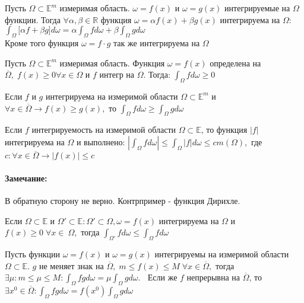 \begin{theorem}
	Пусть $\Omega\subset \mathbb{E}^m$ измеримая область. $\omega=f(x)$  и $\omega=g(x)$ интегрируемые на $\Omega$ функции. Тогда $\forall \alpha, \beta\in\mathbb{R} $ функция $\omega= \alpha f(x) + \beta g(x) $ интегрируема на $\Omega$: \\
	$\int_\Omega \big[\alpha f + \beta g \big]d\omega = \alpha \int_\Omega fd\omega + \beta \int_\Omega gd\omega$  \\
	Кроме того функция $\omega=f\cdot g $ так же интегрируема на $\Omega$ 
\end{theorem}

\begin{theorem}
	Пусть $\Omega\subset \mathbb{E}^m$ измеримая область. Функция $\omega=f(x)$ определена на $\overline{\Omega}, \; f(x)\geq 0 \forall x\in \Omega$ и $f$ интегр на $\Omega$. Тогда: $\int_\Omega fd\omega\geq 0  $
\end{theorem}

\begin{theorem}
	Если $f$ и $g$ интегрируема на измеримой области $\Omega \subset \mathbb{E}^m $ и $\forall x\in \overline{\Omega} \rightarrow f(x) \geq g(x), $ то $ \int_\Omega fd\omega\geq \int_\Omega gd\omega$ 
\end{theorem}

\begin{theorem}
	Если $f$  интегрируемость на измеримой области $\Omega \subset \mathbb{E} $, то функция $|f|$ интегрируема на $\Omega$ и выполнено: $|\int_\Omega fd\omega|\leq \int_\Omega|f|d\omega \leq cm(\Omega),  $ где $c:\forall x\in \overline{\Omega} \rightarrow |f(x)|\leq c $
\end{theorem}

\paragraph{Замечание:}\vspace{-10pt}
В обратную сторону не верно. Контрпример - функция Дирихле.

\begin{theorem}
	Если $\Omega\subset \mathbb{E}$ и $\Omega'\subset \mathbb{E}: \Omega'\subset \Omega, \omega=f(x) $ интегрируема на $\Omega$ и $f(x)\geq 0 \;\forall x\in\ \Omega,$ тогда $\int_{\Omega'}fd\omega \leq \int_\Omega f d\omega $
\end{theorem}

\begin{theorem}
	Пусть функции $\omega=f(x) $ и  $\omega=g(x) $ интегрируемы на измеримой области $\Omega\subset \mathbb{E}$. $g$ не меняет знак на $\overline{\Omega},\; m\leq f(x) \leq M\; \forall x \in \overline{\Omega},$ тогда $\exists \mu: m\leq \mu \leq M:  \int_\Omega fgd\omega = \mu \int_\Omega gd\omega.\;\; $	Если  же $f$ непрерывна на $\overline{\Omega}$, то $\exists x^0 \in \overline{\Omega}:  \int_\Omega fgd\omega = f(x^0) \int_\Omega gd\omega$ 
\end{theorem}


